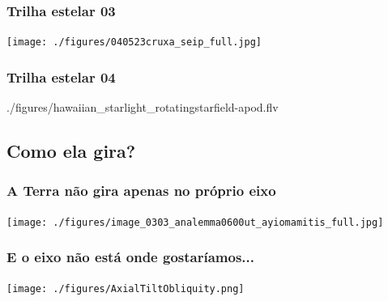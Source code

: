 \begin{frame}
  \frametitle{Trilha estelar 03}
  \begin{center}
    \texttt{[image: ./figures/040523cruxa\_seip\_full.jpg]}
  \end{center}
\end{frame}


\begin{frame}
  \frametitle{Trilha estelar 04}
  \begin{center}
  {./figures/hawaiian_starlight_rotatingstarfield-apod.flv}
  \end{center}
\end{frame}

\subsection{Como ela gira?}
\begin{frame}
  \frametitle{A Terra não gira apenas no próprio eixo}
  \begin{center}
    \texttt{[image: ./figures/image\_0303\_analemma0600ut\_ayiomamitis\_full.jpg]}
  \end{center}
\end{frame}


\begin{frame}
  \frametitle{E o eixo não está onde gostaríamos...}
  \begin{center}
    \texttt{[image: ./figures/AxialTiltObliquity.png]}
  \end{center}
\end{frame}


